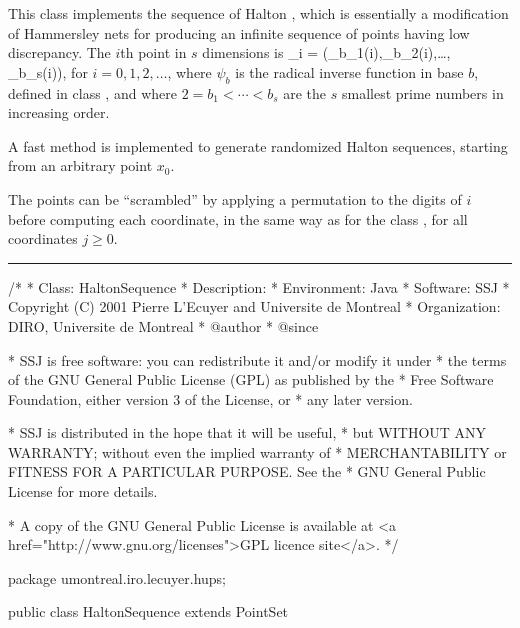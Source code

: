 
This class implements the sequence of Halton \cite{rHAL60a},
which is essentially a modification of Hammersley nets for producing 
an infinite sequence of points having low discrepancy.
The $i$th point in $s$ dimensions is 
\eq
 \bu_i = (\psi_{b_1}(i),\psi_{b_2}(i),\dots, \psi_{b_s}(i)),
\endeq
for $i=0,1,2,\dots$, where $\psi_b$ is the radical inverse function
in base $b$, defined in class , and where
$2 = b_1 < \cdots < b_s$ are the $s$ smallest prime numbers in 
increasing order.

A fast method is implemented to generate randomized Halton sequences, starting from an arbitrary point $x_0$.

The points can be ``scrambled'' by applying a permutation to the 
digits of $i$ before computing each coordinate, in the same way as for the class
, for all coordinates $j\ge 0$.

\bigskip\hrule\bigskip

\begin{code}

\begin{hide}
/*
 * Class:        HaltonSequence
 * Description:  
 * Environment:  Java
 * Software:     SSJ 
 * Copyright (C) 2001  Pierre L'Ecuyer and Universite de Montreal
 * Organization: DIRO, Universite de Montreal
 * @author       
 * @since

 * SSJ is free software: you can redistribute it and/or modify it under
 * the terms of the GNU General Public License (GPL) as published by the
 * Free Software Foundation, either version 3 of the License, or
 * any later version.

 * SSJ is distributed in the hope that it will be useful,
 * but WITHOUT ANY WARRANTY; without even the implied warranty of
 * MERCHANTABILITY or FITNESS FOR A PARTICULAR PURPOSE.  See the
 * GNU General Public License for more details.

 * A copy of the GNU General Public License is available at
   <a href="http://www.gnu.org/licenses">GPL licence site</a>.
 */
\end{hide}
package umontreal.iro.lecuyer.hups;


public class HaltonSequence extends PointSet\begin{hide} { 
   private int[] base;           // Vector of prime bases.
   private int[][] permutation;  // Digits permutation, for each dimension.
   private boolean permuted;     // Permute digits?
   private RadicalInverse[] radinv; // Vector of RadicalInverse's.
   private int[] start;          // starting indices
   private final static int positiveBitMask = ~Integer.reverse(1);
\end{hide}
\end{code}

